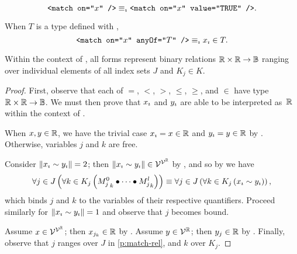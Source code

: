 \begin{axiom}
  \begin{equation*}
    \texttt{<match on="$x$" />}
      \equiv_{\imath} \texttt{<match on="$x$" value="TRUE" />}.
  \end{equation*}
\end{axiom}

\begin{axiom}
  When $T$ is a type defined with ,
  \begin{equation*}
    \texttt{<match on="$x$" anyOf="$T$" />} \equiv_{\imath} {x}_{\imath} \in T.
  \end{equation*}
\end{axiom}

\begin{theorem}
  Within the context of ,
    all  forms represent binary relations
      $\mathbb{R}\times\mathbb{R}\rightarrow\mathbb{B}$
    ranging over individual elements of all index sets $J$ and $K_j\in K$.
\end{theorem}
\begin{proof}
  First,
    observe that each of $=$, $<$, $>$, $\leq$, $\geq$, and $\in$
    have type $\mathbb{R}\times\mathbb{R}\rightarrow\mathbb{B}$.
  We must then prove that ${x}_{\imath}$ and ${y}_{\imath}$ are able to be
    interpreted as~$\mathbb{R}$ within the context of .

  When $x,y\in\mathbb{R}$,
    we have the trivial case ${x}_{\imath}=x\in\mathbb{R}$ and ${y}_{\imath}=y\in\mathbb{R}$
    by .
  Otherwise,
    variables $j$ and $k$ are free.

  Consider $\left\|{x}_{\imath} \sim {y}_{\imath}\right\| = 2$;
    then $\left\|{x}_{\imath} \sim {y}_{\imath}\right\| \in\mathcal{V}^{\mathcal{V}^{\mathbb{R}}}$ by ,
      and so by  we have
  \begin{equation}\label{p:match-rel}
    \Forall{j\in J}{\Forall{k\in K_j}{\cpredmatseq}}
      \equiv
      \Forall{j\in J}{\Forall{k\in K_j}{\varsub x \sim \varsub y}},
  \end{equation}
  which binds $j$ and $k$ to the variables of their respective quantifiers.
  Proceed similarly for $\left\|{x}_{\imath} \sim {y}_{\imath}\right\| = 1$ and observe that
    $j$ becomes bound.

  Assume $x\in\mathcal{V}^{\mathcal{V}^{\mathbb{R}}}$;
    then $x_{j_k}\in\mathbb{R}$ by .
  Assume $y\in\mathcal{V}^{\mathbb{R}}$;
    then $y_j\in\mathbb{R}$ by .
  Finally,
    observe that $j$ ranges over $J$ in \ref{p:match-rel},
      and $k$ over $K_j$.
\end{proof}

